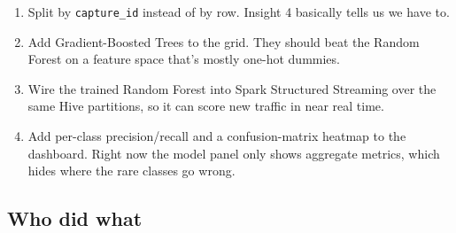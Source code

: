 \documentclass[11pt,a4paper]{article}
\begin{document}
\begin{enumerate}[leftmargin=2em]
    \item Split by \texttt{capture\_id} instead of by row. Insight 4
    basically tells us we have to.
    \item Add Gradient-Boosted Trees to the grid. They should beat the
    Random Forest on a feature space that's mostly one-hot dummies.
    \item Wire the trained Random Forest into Spark Structured Streaming
    over the same Hive partitions, so it can score new traffic in near
    real time.
    \item Add per-class precision/recall and a confusion-matrix heatmap
    to the dashboard. Right now the model panel only shows aggregate
    metrics, which hides where the rare classes go wrong.
\end{enumerate}

\subsection{Who did what}
\end{document}

